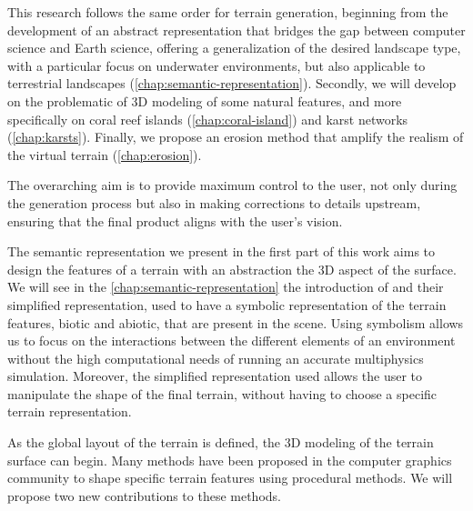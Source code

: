 This research follows the same order for terrain generation, beginning from the development of an abstract representation that bridges the gap between computer science and Earth science, offering a generalization of the desired landscape type, with a particular focus on underwater environments, but also applicable to terrestrial landscapes (\cref{chap:semantic-representation}). Secondly, we will develop on the problematic of 3D modeling of some natural features, and more specifically on coral reef islands (\cref{chap:coral-island}) and karst networks (\cref{chap:karsts}). Finally, we propose an erosion method that amplify the realism of the virtual terrain (\cref{chap:erosion}).

The overarching aim is to provide maximum control to the user, not only during the generation process but also in making corrections to details upstream, ensuring that the final product aligns with the user's vision.

The semantic representation we present in the first part of this work aims to design the features of a terrain with an abstraction the 3D aspect of the surface. We will see in the \cref{chap:semantic-representation} the introduction of  and their simplified representation, used to have a symbolic representation of the terrain features, biotic and abiotic, that are present in the scene. Using symbolism allows us to focus on the interactions between the different elements of an environment without the high computational needs of running an accurate multiphysics simulation. Moreover, the simplified representation used allows the user to manipulate the shape of the final terrain, without having to choose a specific terrain representation.

As the global layout of the terrain is defined, the 3D modeling of the terrain surface can begin. Many methods have been proposed in the computer graphics community to shape specific terrain features using procedural methods. We will propose two new contributions to these methods. 

